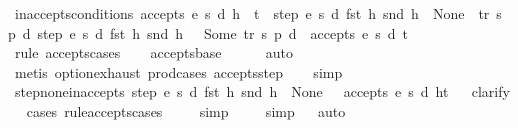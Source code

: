 \begin{isabellebody}
\ inaccepts{\isacharunderscore}conditions{\isacharcolon}\ {\isachardoublequoteopen}{\isasymnot}accepts\ e\ s\ d\ {\isacharparenleft}h\ {\isacharhash}\ t{\isacharparenright}\ {\isasymLongrightarrow}\ step\ e\ s\ d\ {\isacharparenleft}fst\ h{\isacharparenright}\ {\isacharparenleft}snd\ h{\isacharparenright}\ {\isacharequal}\ None\ {\isasymor}\ {\isacharparenleft}{\isasymexists}tr\ s{\isacharprime}\ p{\isacharprime}\ d{\isacharprime}{\isachardot}\ step\ e\ s\ d\ {\isacharparenleft}fst\ h{\isacharparenright}\ {\isacharparenleft}snd\ h{\isacharparenright}\ {\isacharequal}\ \ Some\ {\isacharparenleft}tr{\isacharcomma}\ s{\isacharprime}{\isacharcomma}\ p{\isacharprime}{\isacharcomma}\ d{\isacharprime}{\isacharparenright}\ {\isasymand}\ {\isasymnot}accepts\ e\ s{\isacharprime}\ d{\isacharprime}\ t{\isacharparenright}{\isachardoublequoteclose}\isanewline
%
\isadelimproof
\ \ %
\endisadelimproof
%
\isatagproof
{}\isamarkupfalse%
\ {\isacharparenleft}rule\ accepts{\isachardot}cases{\isacharparenright}\isanewline
\ \ \isamarkupfalse%
\ accepts{\isachardot}base\isanewline
\ \ \ \ \isamarkupfalse%
\ auto{\isacharbrackleft}{}{\isacharbrackright}\isanewline
\ \ \ \isamarkupfalse%
\ {\isacharparenleft}metis\ option{\isachardot}exhaust\ prod{\isacharunderscore}cases{}\ accepts{\isachardot}step{\isacharparenright}\isanewline
\ \ \isamarkupfalse%
\ simp%
\endisatagproof
{\isafoldproof}%
%
\isadelimproof
\isanewline
%
\endisadelimproof
\isanewline
{}\isamarkupfalse%
\ step{\isacharunderscore}none{\isacharunderscore}inaccepts{\isacharcolon}\ {\isachardoublequoteopen}{\isacharparenleft}{\isacharparenleft}step\ e\ s\ d\ {\isacharparenleft}fst\ h{\isacharparenright}\ {\isacharparenleft}snd\ h{\isacharparenright}{\isacharparenright}\ {\isacharequal}\ None{\isacharparenright}\ {\isasymLongrightarrow}\ {\isasymnot}\ {\isacharparenleft}accepts\ e\ s\ d\ {\isacharparenleft}h{\isacharhash}t{\isacharparenright}{\isacharparenright}{\isachardoublequoteclose}\isanewline
%
\isadelimproof
\ \ %
\endisadelimproof
%
\isatagproof
{}\isamarkupfalse%
{\isacharparenleft}clarify{\isacharparenright}\isanewline
\ \ \isamarkupfalse%
{\isacharparenleft}cases\ rule{\isacharcolon}accepts{\isachardot}cases{\isacharparenright}\isanewline
\ \ \ \ \isamarkupfalse%
{\isacharparenleft}simp{\isacharparenright}\isanewline
\ \ \ \isamarkupfalse%
\ simp\isanewline
\ \ \isamarkupfalse%
{\isacharparenleft}auto{\isacharparenright}%

\end{isabellebody}
